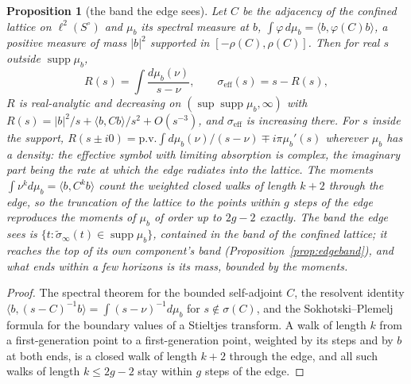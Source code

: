 \documentclass[11pt]{article}
\newtheorem{proposition}[theorem]{Proposition}
\theoremstyle{definition}
\theoremstyle{remark}
\begin{document}
\begin{proposition}[the band the edge sees]\label{prop:spectral}
Let $C$ be the adjacency of the confined lattice on $\ell^2(S^\circ)$ and $\mu_b$ its spectral measure at $b$, $\int\varphi\,d\mu_b=\langle b,\varphi(C)b\rangle$, a positive measure of mass $|b|^2$ supported in $[-\rho(C),\rho(C)]$. Then for real $s$ outside $\operatorname{supp}\mu_b$,
\[
R(s)=\int\frac{d\mu_b(\nu)}{s-\nu},\qquad \sigma_{\mathrm{eff}}(s)=s-R(s),
\]
$R$ is real-analytic and decreasing on $(\sup\operatorname{supp}\mu_b,\infty)$ with $R(s)=|b|^2/s+\langle b,Cb\rangle/s^2+O(s^{-3})$, and $\sigma_{\mathrm{eff}}$ is increasing there. For $s$ inside the support, $R(s\pm i0)=\mathrm{p.v.}\!\int d\mu_b(\nu)/(s-\nu)\mp i\pi\mu_b'(s)$ wherever $\mu_b$ has a density: the effective symbol with limiting absorption is complex, the imaginary part being the rate at which the edge radiates into the lattice. The moments $\int\nu^kd\mu_b=\langle b,C^kb\rangle$ count the weighted closed walks of length $k+2$ through the edge, so the truncation of the lattice to the points within $g$ steps of the edge reproduces the moments of $\mu_b$ of order up to $2g-2$ exactly. The band the edge sees is $\{t:\tilde\sigma_\infty(t)\in\operatorname{supp}\mu_b\}$, contained in the band of the confined lattice; it reaches the top of its own component's band (Proposition~\ref{prop:edgeband}), and what ends within a few horizons is its mass, bounded by the moments.
\end{proposition}
\begin{proof}
The spectral theorem for the bounded self-adjoint $C$, the resolvent identity $\langle b,(s-C)^{-1}b\rangle=\int(s-\nu)^{-1}d\mu_b$ for $s\notin\sigma(C)$, and the Sokhotski--Plemelj formula for the boundary values of a Stieltjes transform. A walk of length $k$ from a first-generation point to a first-generation point, weighted by its steps and by $b$ at both ends, is a closed walk of length $k+2$ through the edge, and all such walks of length $k\le2g-2$ stay within $g$ steps of the edge.
\end{proof}
\end{document}

